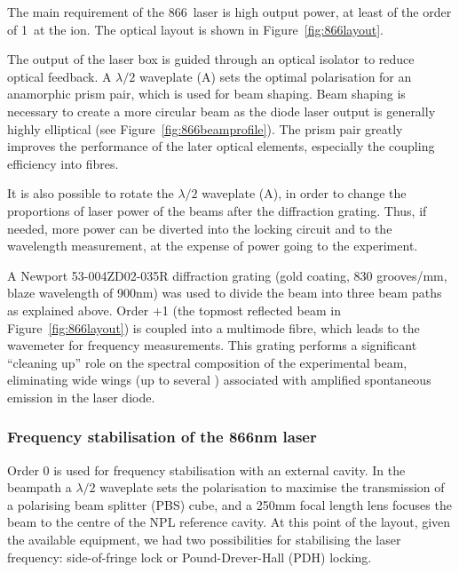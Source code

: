 The main requirement of the 866\nm\, laser is high output power, at least of the order of 1\mW\, at the ion. The optical layout is shown in Figure~\ref{fig:866layout}.

The output of the laser box is guided through an optical isolator to reduce optical feedback. A $\lambda/2$ waveplate (A) sets the optimal polarisation for an anamorphic prism pair, which is used for beam shaping. Beam shaping is necessary to create a more circular beam as the diode laser output is generally highly elliptical (see Figure~\ref{fig:866beamprofile}). The prism pair greatly improves the performance of the later optical elements, especially the coupling efficiency into fibres.

It is also possible to rotate the $\lambda/2$  waveplate (A), in order to change the proportions of laser power of the beams after the diffraction grating. Thus, if needed, more power can be diverted into the locking circuit and to the wavelength measurement, at the expense of power going to the experiment.

A Newport 53-004ZD02-035R diffraction grating (gold coating, 830 grooves/mm, blaze wavelength of 900nm) was used to divide the beam into three beam paths as explained above. Order +1 (the topmost reflected beam in Figure~\ref{fig:866layout}) is coupled into a multimode fibre, which leads to the wavemeter for frequency measurements. This grating performs a significant ``cleaning up'' role on the spectral composition of the experimental beam, eliminating wide wings (up to several \nm) associated with amplified spontaneous emission in the laser diode.

\subsubsection{Frequency stabilisation of the 866nm laser}
Order 0 is used for frequency stabilisation with an external cavity. In the beampath a $\lambda/2$ waveplate sets the polarisation to maximise the transmission of a polarising beam splitter (PBS) cube, and a 250mm  focal length lens focuses the beam to the centre of the NPL reference cavity. At this point of the layout, given the available equipment, we had two possibilities for stabilising the laser frequency: side-of-fringe lock or Pound-Drever-Hall (PDH) locking.


